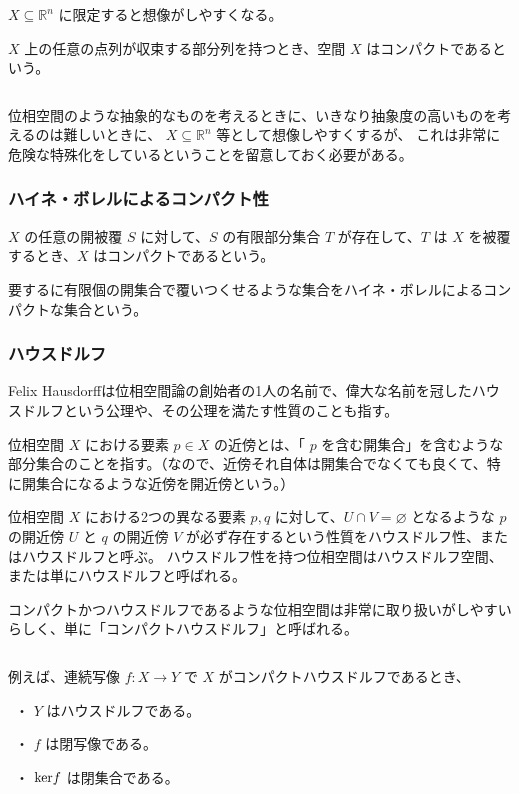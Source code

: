 \documentclass[uplatex,a4j,12pt,dvipdfmx]{jsarticle}
\begin{document}
$X \subseteq \mathbb{R}^{n}$ に限定すると想像がしやすくなる。

$X$ 上の任意の点列が収束する部分列を持つとき、空間 $X$ はコンパクトであるという。

${}$

位相空間のような抽象的なものを考えるときに、いきなり抽象度の高いものを考えるのは難しいときに、
$X \subseteq \mathbb{R}^{n}$ 等として想像しやすくするが、
これは非常に危険な特殊化をしているということを留意しておく必要がある。


\subsubsection{ハイネ・ボレルによるコンパクト性}

$X$ の任意の開被覆 $S$ に対して、$S$ の有限部分集合 $T$ が存在して、$T$ は $X$ を被覆するとき、$X$ はコンパクトであるという。

要するに有限個の開集合で覆いつくせるような集合をハイネ・ボレルによるコンパクトな集合という。

\subsubsection{ハウスドルフ}

Felix Hausdorffは位相空間論の創始者の1人の名前で、偉大な名前を冠したハウスドルフという公理や、その公理を満たす性質のことも指す。

位相空間 $X$ における要素 $p \in X$ の近傍とは、「 $p$ を含む開集合」を含むような部分集合のことを指す。（なので、近傍それ自体は開集合でなくても良くて、特に開集合になるような近傍を開近傍という。）

位相空間 $X$ における2つの異なる要素 $p,q$ に対して、$U \cap V = \varnothing$ となるような
$p$ の開近傍 $U$ と $q$ の開近傍 $V$ が必ず存在するという性質をハウスドルフ性、またはハウスドルフと呼ぶ。
ハウスドルフ性を持つ位相空間はハウスドルフ空間、または単にハウスドルフと呼ばれる。

コンパクトかつハウスドルフであるような位相空間は非常に取り扱いがしやすいらしく、単に「コンパクトハウスドルフ」と呼ばれる。

${}$

例えば、連続写像 $f: X \to Y$ で
$X$ がコンパクトハウスドルフであるとき、

\ ・ $Y$ はハウスドルフである。

\ ・ $f$ は閉写像である。

\ ・ ${\rm ker} f $ は閉集合である。
\end{document}

